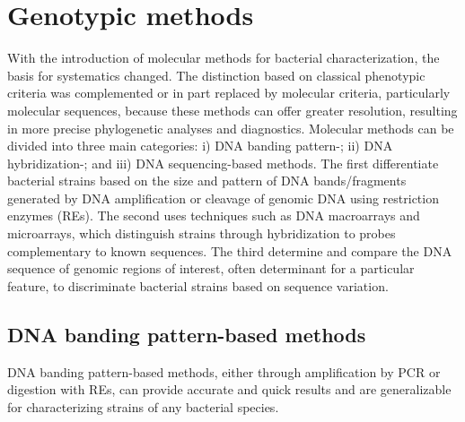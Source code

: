 \begin{figure}[!ht]
    \label{fig:introduction_figure3}
\end{figure}

\section{Genotypic methods}

With the introduction of molecular methods for bacterial characterization, the basis for systematics changed. The distinction based on classical phenotypic criteria was complemented or in part replaced by molecular criteria, particularly molecular sequences, because these methods can offer greater resolution, resulting in more precise phylogenetic analyses and diagnostics. Molecular methods can be divided into three main categories: i) \ac{DNA} banding pattern-; ii) \ac{DNA} hybridization-; and iii) \ac{DNA} sequencing-based methods. The first differentiate bacterial strains based on the size and pattern of \ac{DNA} bands/fragments generated by \ac{DNA} amplification or cleavage of genomic \ac{DNA} using restriction enzymes (\acs{RE}s). The second uses techniques such as \ac{DNA} macroarrays and microarrays, which distinguish strains through hybridization to probes complementary to known sequences. The third determine and compare the \ac{DNA} sequence of genomic regions of interest, often determinant for a particular feature, to discriminate bacterial strains based on sequence variation.

\subsection{DNA banding pattern-based methods}

\ac{DNA} banding pattern-based methods, either through amplification by \ac{PCR} or digestion with \acs{RE}s, can provide accurate and quick results and are generalizable for characterizing strains of any bacterial species.


